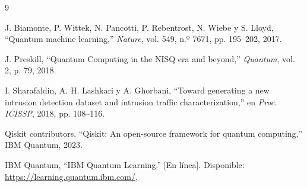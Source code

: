 \documentclass[10pt,conference]{IEEEtran}
\begin{document}
\begin{thebibliography}{9}

J. Biamonte, P. Wittek, N. Pancotti, P. Rebentrost, N. Wiebe y S. Lloyd,
``Quantum machine learning,'' \textit{Nature}, vol. 549, n.º 7671,
pp. 195--202, 2017.

J. Preskill, ``Quantum Computing in the NISQ era and beyond,''
\textit{Quantum}, vol. 2, p. 79, 2018.

I. Sharafaldin, A. H. Lashkari y A. Ghorbani, ``Toward generating a new
intrusion detection dataset and intrusion traffic characterization,''
en \textit{Proc. ICISSP}, 2018, pp. 108--116.

Qiskit contributors, ``Qiskit: An open-source framework for quantum
computing,'' IBM Quantum, 2023.

IBM Quantum, ``IBM Quantum Learning.'' [En línea]. Disponible:
\url{https://learning.quantum.ibm.com/}.

\end{thebibliography}
\end{document}
